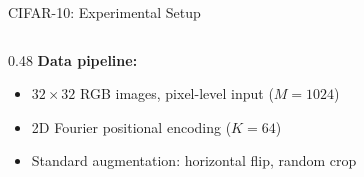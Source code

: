 \documentclass[aspectratio=169,11pt]{beamer}
\begin{document}
\begin{frame}[shrink=5]{CIFAR-10: Experimental Setup}
\begin{columns}[T]
\begin{column}{0.48\textwidth}
      \vspace{0.5em}
      \textbf{Data pipeline:}
      \begin{itemize}
        \item $32\!\times\!32$ RGB images, pixel-level input ($M\!=\!1024$)
        \item 2D Fourier positional encoding ($K\!=\!64$)
        \item Standard augmentation: horizontal flip, random crop
      \end{itemize}
    \end{column}
  \end{columns}
\end{frame}

\end{document}
